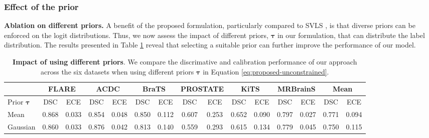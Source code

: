 \documentclass[twocolumn,final,10pt]{elsarticle}
\newcommand{\rev}[1]{{\color{black}#1}}
\begin{document}
\subsubsection{\rev{Effect of the prior}}

\noindent \textbf{Ablation on different priors.} A benefit of the proposed formulation, particularly compared to SVLS \citep{islam2021spatially}, is that diverse priors can be enforced on the logit distributions. Thus, we now assess the impact of different priors, $\bm \tau$ in our formulation, that can distribute the label distribution. The results presented in Table \ref{table:prior} reveal that selecting a suitable prior can further improve the performance of our model.


\begin{table}[h!]
\centering
\scriptsize
\caption{\textbf{Impact of using different priors}. We compare the discrimative and calibration performance of our approach across the six datasets when using different priors $\bm \tau$ in Equation \ref{eq:proposed-unconstrained}.}
\begin{tabular}{l | cc | cc | cc| cc | cc | cc | cc }
                    \toprule
                    & \multicolumn{2}{c|}{FLARE} & 
                    \multicolumn{2}{c|}{ACDC} & \multicolumn{2}{c|}{BraTS}  & \multicolumn{2}{c|}{\rev{PROSTATE}} & \multicolumn{2}{c|}{\rev{KiTS}} & \multicolumn{2}{c|}{\rev{MRBrainS}} & \multicolumn{2}{c}{\rev{Mean}} \\
                    \midrule
                    Prior $\bm \tau $& DSC & ECE & DSC & ECE & DSC & ECE & DSC & ECE & DSC & ECE & DSC & ECE & DSC & ECE \\
    \midrule
Mean & 0.868 & 0.033 & 0.854 & 0.048 & 0.850 & 0.112 & 0.607 & 0.253 & 0.652 & 0.090 & 0.797 & 0.027 & 0.771 & 0.094 \\
Gaussian & 0.860 & 0.033 & 0.876 & 0.042 & 0.813 & 0.140 & 0.559 & 0.293 & 0.615 & 0.134 & 0.779 & 0.045 & 0.750 & 0.115 \\
\bottomrule
\end{tabular}
\label{table:prior}
\end{table}
\end{document}
